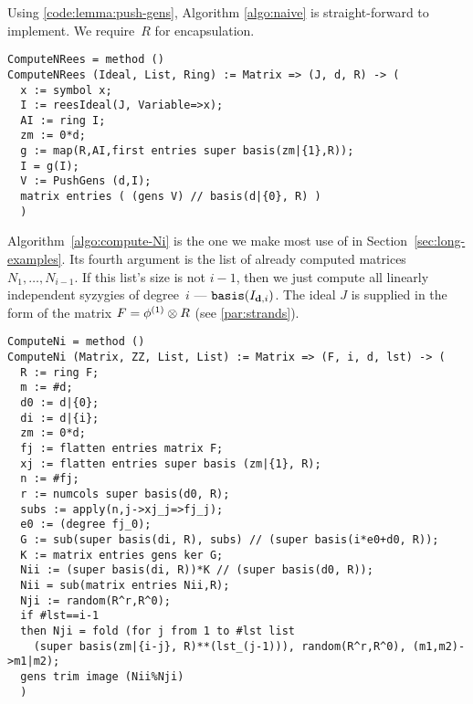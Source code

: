 \documentclass[fleqn,reqno]{amsart}
\begin{document}
\begin{paragraf}
\label{code:algo:naive}
Using \eqref{code:lemma:push-gens},
Algorithm \ref{algo:naive} is straight-forward to implement.
We require~$R$ for encapsulation.
\begin{verbatim}
ComputeNRees = method ()
ComputeNRees (Ideal, List, Ring) := Matrix => (J, d, R) -> (
  x := symbol x;
  I := reesIdeal(J, Variable=>x);
  AI := ring I;
  zm := 0*d;
  g := map(R,AI,first entries super basis(zm|{1},R));
  I = g(I);
  V := PushGens (d,I);
  matrix entries ( (gens V) // basis(d|{0}, R) )
  )
\end{verbatim}
\end{paragraf}

\begin{paragraf}
\label{code:algo:compute-Ni}
Algorithm~\ref{algo:compute-Ni} is the one we make most use of in Section~\ref{sec:long-examples}.
Its fourth argument is the list of already computed matrices $N_1,\ldots,N_{i-1}$.
If this list's size is not $i-1$,
then we just compute all linearly independent syzygies of degree~$i$ --- $\mathop{\tt basis}(I_{\mathbf d,i})$.
The ideal $J$ is supplied in the form of the matrix
$F=\phi^{(1)}\otimes R$ (see \ref{par:strands}).
\begin{verbatim}
ComputeNi = method ()
ComputeNi (Matrix, ZZ, List, List) := Matrix => (F, i, d, lst) -> (
  R := ring F;
  m := #d;
  d0 := d|{0};
  di := d|{i};
  zm := 0*d;
  fj := flatten entries matrix F;
  xj := flatten entries super basis (zm|{1}, R);
  n := #fj;
  r := numcols super basis(d0, R);
  subs := apply(n,j->xj_j=>fj_j);
  e0 := (degree fj_0);
  G := sub(super basis(di, R), subs) // (super basis(i*e0+d0, R));
  K := matrix entries gens ker G;
  Nii := (super basis(di, R))*K // (super basis(d0, R));
  Nii = sub(matrix entries Nii,R);
  Nji := random(R^r,R^0);
  if #lst==i-1
  then Nji = fold (for j from 1 to #lst list
    (super basis(zm|{i-j}, R)**(lst_(j-1))), random(R^r,R^0), (m1,m2)->m1|m2);
  gens trim image (Nii%Nji)
  )
\end{verbatim}
\end{paragraf}
\end{document}
